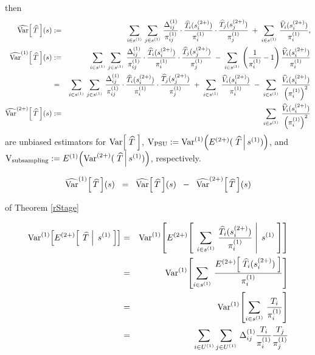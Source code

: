 \begin{theorem}
then
\begin{eqnarray*}
\widehat{\textnormal{Var}}\!\left[\,\widehat{T}\,\right]\!(s)
&:=&
\sum_{i\in s^{(1)}}\,\sum_{j\in s^{(1)}}\,
\dfrac{\Delta^{(1)}_{ij}}{\pi^{(1)}_{ij}}
\cdot
\dfrac{\widehat{T}_{i}(s^{(2+)}_{i})}{\pi^{(1)}_{i}}
\cdot
\dfrac{\widehat{T}_{j}(s^{(2+)}_{j})}{\pi^{(1)}_{j}}
\;+\;
\sum_{i\in s^{(1)}}\,\dfrac{\widehat{V}_{i}(s^{(2+)}_{i})}{\pi^{(1)}_{i}},
\\
\widehat{\textnormal{Var}}^{(1)}\!\left[\,\widehat{T}\,\right]\!(s)
&:=&
\sum_{i\in s^{(1)}}\,\sum_{j\in s^{(1)}}\,
\dfrac{\Delta^{(1)}_{ij}}{\pi^{(1)}_{ij}}
\cdot
\dfrac{\widehat{T}_{i}(s^{(2+)}_{i})}{\pi^{(1)}_{i}}
\cdot
\dfrac{\widehat{T}_{j}(s^{(2+)}_{j})}{\pi^{(1)}_{j}}
\;-\;
\sum_{i\in s^{(1)}}\,\left(\dfrac{1}{\pi^{(1)}_{i}} - 1\right)\dfrac{\widehat{V}_{i}(s^{(2+)}_{i})}{\pi^{(1)}_{i}}
\\
&=&
\sum_{i\in s^{(1)}}\,\sum_{j\in s^{(1)}}\,
\dfrac{\Delta^{(1)}_{ij}}{\pi^{(1)}_{ij}}
\cdot
\dfrac{\widehat{T}_{i}(s^{(2+)}_{i})}{\pi^{(1)}_{i}}
\cdot
\dfrac{\widehat{T}_{j}(s^{(2+)}_{j})}{\pi^{(1)}_{j}}
\;+\;
\sum_{i\in s^{(1)}}\,\dfrac{\widehat{V}_{i}(s^{(2+)}_{i})}{\pi^{(1)}_{i}}
\;-\;
\sum_{i\in s^{(1)}}\,\dfrac{\widehat{V}_{i}(s^{(2+)}_{i})}{\left(\pi^{(1)}_{i}\right)^{2}}
\\
\widehat{\textnormal{Var}}^{(2+)}\!\left[\,\widehat{T}\,\right]\!(s)
&:=&
\sum_{i\in s^{(1)}}\,\dfrac{\widehat{V}_{i}(s^{(2+)}_{i})}{\left(\pi^{(1)}_{i}\right)^{2}}
\end{eqnarray*}
are unbiased estimators for
$\textnormal{Var}\!\left[\;\widehat{T}\;\right]$,\;
$\textnormal{V}_{\textnormal{PSU}} := \textnormal{Var}^{(1)}\!\left(E^{(2+)}(\,\left.\widehat{T}\,\right\vert s^{(1)})\right)$,
and\;
$\textnormal{V}_{\textnormal{subsampling}} := E^{(1)}\!\left(\textnormal{Var}^{(2+)}(\,\left.\widehat{T}\,\right\vert s^{(1)})\right)$,
respectively.
\end{theorem}

\begin{corollary}
\begin{equation}
\widehat{\textnormal{Var}}^{(1)}\!\left[\,\widehat{T}\,\right]\!(s)
\;\;=\;\;
\widehat{\textnormal{Var}}\!\left[\,\widehat{T}\,\right]\!(s)
\;\;-\;\;
\widehat{\textnormal{Var}}^{(2+)}\!\left[\,\widehat{T}\,\right]\!(s)
\end{equation}
\end{corollary}

\proof\!\!\!\!\!\!of Theorem \ref{rStage}

\begin{eqnarray*}
\textnormal{Var}^{(1)}\!\left[E^{(2+)}\!\left[\;\left.\widehat{T}\;\right\vert\;s^{(1)}\;\right]\right]
&=&
\textnormal{Var}^{(1)}\!\left[E^{(2+)}\!\left[\;\left.
\sum_{i\in s^{(1)}}\,\frac{\widehat{T}_{i}(s^{(2+)}_{i})}{\pi^{(1)}_{i}}
\;\right\vert\;s^{(1)}\;\right]\right]
\\
&=&
\textnormal{Var}^{(1)}\!\left[\sum_{i\in s^{(1)}}\,
\frac{E^{(2+)}\!\left[\;\widehat{T}_{i}(s^{(2+)}_{i})\;\right]}{\pi^{(1)}_{i}}
\right]
\\
&=&
\textnormal{Var}^{(1)}\!\left[\sum_{i\in s^{(1)}}\,\frac{T_{i}}{\pi^{(1)}_{i}}\right]
\\
&=&
\sum_{i\in U^{(1)}}\sum_{j\in U^{(1)}}\,\Delta^{(1)}_{ij}\frac{T_{i}}{\pi^{(1)}_{i}}\frac{T_{j}}{\pi^{(1)}_{j}}
\end{eqnarray*}

